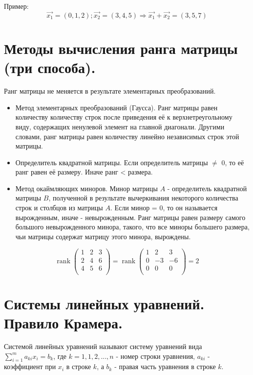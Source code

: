 \documentclass[12pt]{article}
\DeclareMathOperator{\rank}{rank}
\begin{document}
\begin{sloppypar}
    Пример:
    \[
        \Vec{x_1} = (0, 1, 2); \Vec{x_2} = (3, 4, 5) \Rightarrow \Vec{x_1} + \Vec{x_2} = (3, 5, 7)
    \]

    \section{Методы вычисления ранга матрицы (три способа).}
    Ранг матрицы не меняется в результате элементарных преобразований.

    \begin{itemize}
        \item Метод элементарных преобразований (Гаусса). Ранг матрицы равен количеству количеству строк после приведения её к верхнетреугольному виду, содержащих ненулевой элемент на главной диагонали. Другими словами, ранг матрицы равен количеству линейно независимых строк этой матрицы.
        \item Определитель квадратной матрицы. Если определитель матрицы $\neq$ 0, то её ранг равен её размеру. Иначе ранг < размера.
        \item Метод окаймляющих миноров. Минор матрицы $A$ - определитель квадратной матрицы $B$, полученной в результате вычеркивания некоторого количества строк и столбцов из матрицы $A$. Если минор = 0, то он называется вырожденным, иначе - невырожденным. Ранг матрицы равен размеру самого большого невырожденного минора, такого, что все миноры большего размера, чьи матрицы содержат матрицу этого минора, вырождены.
    \end{itemize}

    \[
        \rank \begin{pmatrix}
            1 & 2 & 3 \\
            2 & 4 & 6 \\
            4 & 5 & 6 \\
        \end{pmatrix} = \rank \begin{pmatrix}
            1 & 2  & 3  \\
            0 & -3 & -6 \\
            0 & 0  & 0  \\
        \end{pmatrix} = 2
    \]

    \section{Системы линейных уравнений. Правило Крамера.}
    Системой линейных уравнений называют систему уравнений вида $\sum^m_{i = 1}a_{ki}x_i = b_k$, где $k = 1, 1, 2, ..., n$ - номер строки уравнения, $a_{ki}$ - коэффициент при $x_i$ в строке $k$, а $b_k$ - правая часть уравнения в строке $k$.


\end{sloppypar}
\end{document}
